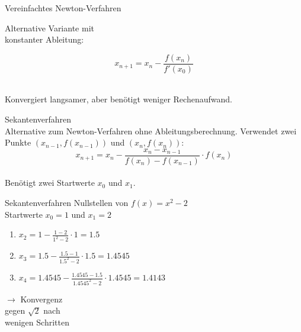 \begin{theorem}{Vereinfachtes Newton-Verfahren}\\
    \begin{minipage}{0.5\textwidth}
        Alternative Variante mit \\ konstanter Ableitung:
    \end{minipage}
    \begin{minipage}{0.25\textwidth}
        \vspace{-5mm}
        $$x_{n+1} = x_n - \frac{f(x_n)}{f'(x_0)}$$
    \end{minipage}
    \vspace{1mm}\\
    Konvergiert langsamer, aber benötigt weniger Rechenaufwand.
\end{theorem}

\begin{concept}{Sekantenverfahren}\\
    Alternative zum Newton-Verfahren ohne Ableitungsberechnung. Verwendet zwei Punkte $(x_{n-1}, f(x_{n-1}))$ und $(x_n, f(x_n))$:
    \vspace{-2mm}\\
    $$x_{n+1} = x_n - \frac{x_n-x_{n-1}}{f(x_n)-f(x_{n-1})} \cdot f(x_n)$$
    \vspace{-3mm}\\
    Benötigt zwei Startwerte $x_0$ und $x_1$.
\end{concept}


\begin{example2}{Sekantenverfahren} Nullstellen von $f(x)=x^2-2$\\
Startwerte $x_0 = 1$ und $x_1 = 2$
\vspace{1mm}\\
\begin{minipage}[t]{0.65\textwidth}
    \vspace{-3mm}
    \begin{enumerate}
        \item $x_2 = 1 - \frac{1-2}{1^2-2} \cdot 1 = 1.5$
        \item $x_3 = 1.5 - \frac{1.5-1}{1.5^2-2} \cdot 1.5 = 1.4545$
        \item $x_4 = 1.4545 - \frac{1.4545-1.5}{1.4545^2-2} \cdot 1.4545 = 1.4143$
    \end{enumerate}
\end{minipage}
\hspace{2mm}
\begin{minipage}[t]{0.28\textwidth}
    $\rightarrow$ Konvergenz\\ gegen $\sqrt{2}$ nach \\wenigen Schritten
\end{minipage}
\end{example2}

